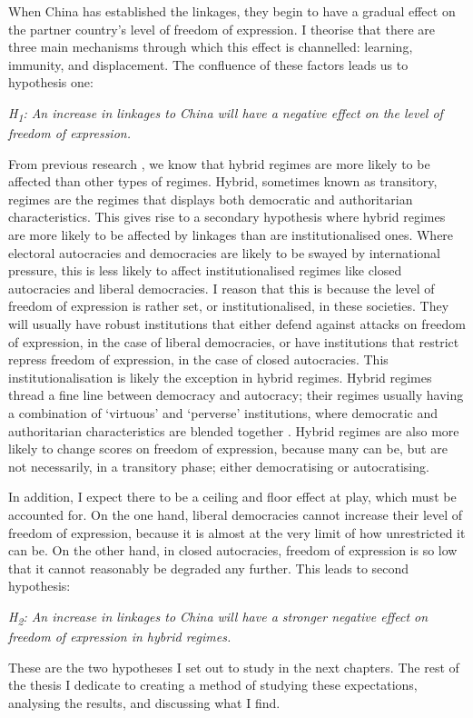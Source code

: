 When China has established the linkages, they begin to have a gradual effect on the partner country's level of freedom of expression. I theorise that there are three main mechanisms through which this effect is channelled: learning, immunity, and displacement. The confluence of these factors leads us to hypothesis one:
\begin{displayquote}
    \textit{H\textsubscript{1}: An increase in linkages to China will have a negative effect on the level of freedom of expression.}  
\end{displayquote}

From previous research \citep{toettoe_foreign_2023}, we know that hybrid regimes are more likely to be affected than other types of regimes. Hybrid, sometimes known as transitory, regimes are the regimes that displays both democratic and authoritarian characteristics. This gives rise to a secondary hypothesis where hybrid regimes are more likely to be affected by linkages than are institutionalised ones. Where electoral autocracies and democracies are likely to be swayed by international pressure, this is less likely to affect institutionalised regimes like closed autocracies and liberal democracies. I reason that this is because the level of freedom of expression is rather set, or institutionalised, in these societies. They will usually have robust institutions that either defend against attacks on freedom of expression, in the case of liberal democracies, or have institutions that restrict repress freedom of expression, in the case of closed autocracies. This institutionalisation is likely the exception in hybrid regimes. Hybrid regimes thread a fine line between democracy and autocracy; their regimes usually having a combination of `virtuous' and `perverse' institutions, where democratic and authoritarian characteristics are blended together \citep{valenzuela_democratic_1990}. Hybrid regimes are also more likely to change scores on freedom of expression, because many can be, but are not necessarily, in a transitory phase; either democratising or autocratising.

In addition, I expect there to be a ceiling and floor effect at play, which must be accounted for. On the one hand, liberal democracies cannot increase their level of freedom of expression, because it is almost at the very limit of how unrestricted it can be. On the other hand, in closed autocracies, freedom of expression is so low that it cannot reasonably be degraded any further. This leads to second hypothesis:
\begin{displayquote}
    \textit{H\textsubscript{2}: An increase in linkages to China will have a stronger negative effect on freedom of expression in hybrid regimes.}
\end{displayquote}

These are the two hypotheses I set out to study in the next chapters. The rest of the thesis I dedicate to creating a method of studying these expectations, analysing the results, and discussing what I find. 